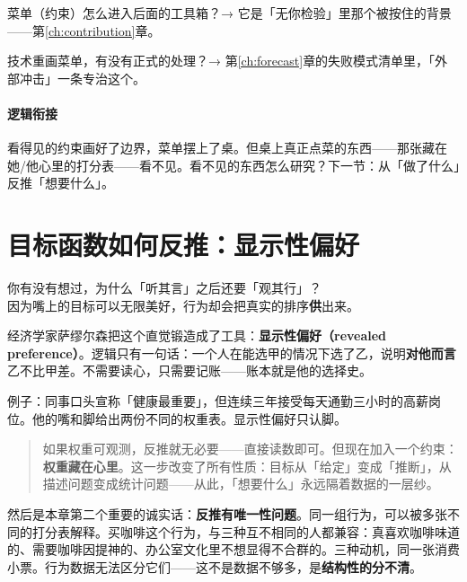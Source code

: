 \documentclass[../../main2.tex]{subfiles}
\begin{document}
	\begin{reader_anticipation}
		\item 菜单（约束）怎么进入后面的工具箱？→ 它是「无你检验」里那个被按住的背景——第\ref{ch:contribution}章。
		\item 技术重画菜单，有没有正式的处理？→ 第\ref{ch:forecast}章的失败模式清单里，「外部冲击」一条专治这个。
	\end{reader_anticipation}

	\paragraph*{逻辑衔接}
	看得见的约束画好了边界，菜单摆上了桌。但桌上真正点菜的东西——那张藏在她/他心里的打分表——看不见。看不见的东西怎么研究？下一节：从「做了什么」反推「想要什么」。

	\section{目标函数如何反推：显示性偏好}
	\label{sec:goal-reveal}

	\begin{readingnote}
		你有没有想过，为什么「听其言」之后还要「观其行」？\\
		因为嘴上的目标可以无限美好，行为却会把真实的排序\textbf{供}出来。
	\end{readingnote}

	经济学家萨缪尔森把这个直觉锻造成了工具：\textbf{显示性偏好（revealed preference）}。逻辑只有一句话：一个人在能选甲的情况下选了乙，说明\textbf{对他而言}乙不比甲差。不需要读心，只需要记账——账本就是他的选择史。

	例子：同事口头宣称「健康最重要」，但连续三年接受每天通勤三小时的高薪岗位。他的嘴和脚给出两份不同的权重表。显示性偏好只认脚。

	\begin{quote}
		如果权重可观测，反推就无必要——直接读数即可。但现在加入一个约束：\textbf{权重藏在心里}。这一步改变了所有性质：目标从「给定」变成「推断」，从描述问题变成统计问题——从此，「想要什么」永远隔着数据的一层纱。
	\end{quote}

	然后是本章第二个重要的诚实话：\textbf{反推有唯一性问题}。同一组行为，可以被多张不同的打分表解释。买咖啡这个行为，与三种互不相同的人都兼容：真喜欢咖啡味道的、需要咖啡因提神的、办公室文化里不想显得不合群的。三种动机，同一张消费小票。行为数据无法区分它们——这不是数据不够多，是\textbf{结构性的分不清}。
\end{document}
